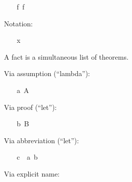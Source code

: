\begin{isabellebody}
\endisatagproof
{\isafoldproof}%
%
\isadelimproof
%
\endisadelimproof
\isanewline
\ \ \isamarkupfalse%
\ {}{}f\ {}f{}%
\isadelimproof
%
\endisadelimproof
%
\isatagproof
%
\begin{isamarkuptxt}%
Notation:%
\end{isamarkuptxt}%
\isamarkuptrue%
\ \ \isamarkupfalse%
\ x\ \ {}{}{}{}{}{}{}%
\endisatagproof
{\isafoldproof}%
%
\isadelimproof
%
\endisadelimproof
\isanewline
{}\isamarkupfalse%
%
\isamarkuptrue%
%
\begin{isamarkuptext}%
A fact is a simultaneous list of theorems.%
\end{isamarkuptext}%
\isamarkuptrue%
%
\isamarkuptrue%
\isamarkupfalse%
\isanewline
{}%
\isadelimproof
%
\endisadelimproof
%
\isatagproof
%
\begin{isamarkuptxt}%
Via assumption (``lambda''):%
\end{isamarkuptxt}%
\isamarkuptrue%
\ \ \isamarkupfalse%
\ a{}\ A%
\begin{isamarkuptxt}%
Via proof (``let''):%
\end{isamarkuptxt}%
\isamarkuptrue%
\ \ \isamarkupfalse%
\ b{}\ B\ \isamarkupfalse%
%
\begin{isamarkuptxt}%
Via abbreviation (``let''):%
\end{isamarkuptxt}%
\isamarkuptrue%
\ \ \isamarkupfalse%
\ c\ {}\ a\ b%
\endisatagproof
{\isafoldproof}%
%
\isadelimproof
%
\endisadelimproof
\isanewline
\isanewline
{}\isamarkupfalse%
%
\isamarkuptrue%
\isamarkupfalse%
\isanewline
{}%
\isadelimproof
%
\endisadelimproof
%
\isatagproof
%
\begin{isamarkuptxt}%
Via explicit name:%
\end{isamarkuptxt}%
\isamarkuptrue%
\ \ \isamarkupfalse%

\end{isabellebody}
